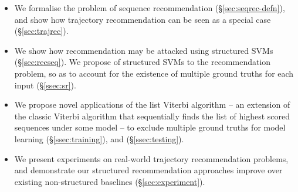 \begin{itemize}[noitemsep,leftmargin=12pt]\itemmoveup
	\item We formalise the problem of sequence recommendation (\S\ref{sec:seqrec-defn}), and show how trajectory recommendation can be seen as a special case (\S\ref{sec:trajrec}).

	\item We show how  recommendation may be attacked using structured SVMs (\S\ref{sec:recseq}).
	We propose  of structured SVMs to the recommendation problem, so as to account for the existence of multiple ground truths for each input (\S\ref{ssec:sr}).

    \item We propose  novel applications of the list Viterbi algorithm -- an extension of the classic Viterbi algorithm that sequentially finds the list of highest scored sequences under some model --
to exclude multiple ground truths for model learning (\S\ref{ssec:training}),
and  (\S\ref{ssec:testing}).
	
	\item We present experiments on real-world trajectory recommendation problems, and demonstrate our structured recommendation approaches improve over existing non-structured baselines (\S\ref{sec:experiment}).\itemmoveup
\end{itemize}

